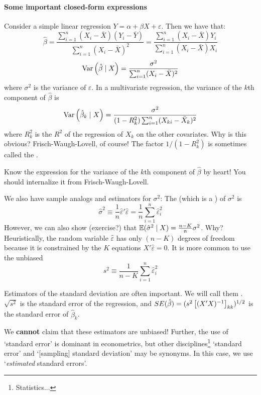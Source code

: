 \documentclass[10pt]{article}
\begin{document}
\paragraph{Some important closed-form expressions} Consider a simple linear regression $Y = \alpha + \beta X + \varepsilon$. Then we have that: \[ \hat{\beta} = \frac{\sum_{i=1}^n (X_i - \bar{X})(Y_i - \bar{Y})}{\sum_{i=1}^n (X_i - \bar{X})^2} = \frac{\sum_{i=1}^n (X_i - \bar{X})Y_i}{\sum_{i=1}^n (X_i - \bar{X})X_i}\]\[\mathop{\rm Var}\left(\hat{\beta} \mid X\right) = \frac{\sigma^2}{\sum_{i=1}^n (X_i-\bar{X})^2}\]where $\sigma^2$ is the variance of $\varepsilon$. In a multivariate regression, the variance of the $k$th component of $\hat{\beta}$ is \[\mathop{\rm Var}\left( \hat{\beta}_k \mid X\right) = \frac{\sigma^2}{(1-R_k^2) \sum_{i=1}^n (X_{ki} - \bar{X}_k)^2}\] where $R_k^2$ is the $R^2$ of the regression of $X_k$ on the other covariates. Why is this obvious? Frisch-Waugh-Lovell, of course! The factor $1 / (1-R_k^2)$ is sometimes called the . 
	
	\begin{remark}
		Know the expression for the variance of the $k$th component of $\hat{\beta}$ by heart! You should internalize it from Frisch-Waugh-Lovell.
	\end{remark}
	
	We also have sample analogs and estimators for $\sigma^2$: The  (which is a ) of $\sigma^2$ is \[\hat{\sigma}^2 \equiv \frac{1}{n} \hat{\varepsilon}' \hat{\varepsilon} = \frac{1}{n} \sum_{i=1}^n \hat{\varepsilon}_i^2\]However, we can also show (exercise?) that $\mathbb{E}(\hat{\sigma}^2 \mid X ) = \frac{n-K}{n}\sigma^2$. Why? Heuristically, the random variable $\hat{\varepsilon}$ has only $(n-K)$ degrees of freedom because it is constrained by the $K$ equations $X'\hat{\varepsilon} = 0$. It is more common to use the unbiased \[s^2 \equiv \frac{1}{n-K}\sum_{i=1}^n \hat{\varepsilon}_i^2\]
	
	Estimators of the standard deviation are often important. We will call them . $\sqrt{s^2}$ is the standard error of the regression, and $SE(\hat{\beta}) = (s^2 \begin{bmatrix}(X'X)^{-1}\end{bmatrix}_{kk})^{1/2}$ is the standard error of $\hat{\beta}_k$.
	
	\begin{remark}
		We \textbf{cannot} claim that these estimators are unbiased! Further, the use of `standard error' is dominant in econometrics, but other disciplines\footnote{Statistics...} `standard error' and `[sampling] standard deviation' may be synonyms. In this case, we use `\emph{estimated} standard errors'.
	\end{remark}
	
\end{document}
